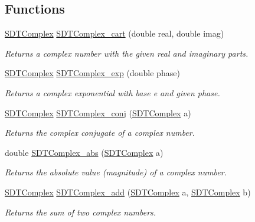 \subsection*{Functions}
\begin{DoxyCompactItemize}
\item 
\hyperlink{struct_s_d_t_complex}{S\+D\+T\+Complex} \hyperlink{group__complex_ga0e9bfb21fd5dd18d5c9ce8ca46c69bb9}{S\+D\+T\+Complex\+\_\+cart} (double real, double imag)
\begin{DoxyCompactList}\small\item\em Returns a complex number with the given real and imaginary parts. \end{DoxyCompactList}\item 
\hyperlink{struct_s_d_t_complex}{S\+D\+T\+Complex} \hyperlink{group__complex_gadab30e2d42c6d4d09a9377340d8130a5}{S\+D\+T\+Complex\+\_\+exp} (double phase)
\begin{DoxyCompactList}\small\item\em Returns a complex exponential with base e and given phase. \end{DoxyCompactList}\item 
\hyperlink{struct_s_d_t_complex}{S\+D\+T\+Complex} \hyperlink{group__complex_gaeeb0da7bd344c3c11659bdf6ed4fe28d}{S\+D\+T\+Complex\+\_\+conj} (\hyperlink{struct_s_d_t_complex}{S\+D\+T\+Complex} a)
\begin{DoxyCompactList}\small\item\em Returns the complex conjugate of a complex number. \end{DoxyCompactList}\item 
double \hyperlink{group__complex_gabacc30ac0cc7bf106ba1319c621f20be}{S\+D\+T\+Complex\+\_\+abs} (\hyperlink{struct_s_d_t_complex}{S\+D\+T\+Complex} a)
\begin{DoxyCompactList}\small\item\em Returns the absolute value (magnitude) of a complex number. \end{DoxyCompactList}\item 
\hyperlink{struct_s_d_t_complex}{S\+D\+T\+Complex} \hyperlink{group__complex_gad6478dedaf5b90f78c4cb6e4a6f6165c}{S\+D\+T\+Complex\+\_\+add} (\hyperlink{struct_s_d_t_complex}{S\+D\+T\+Complex} a, \hyperlink{struct_s_d_t_complex}{S\+D\+T\+Complex} b)
\begin{DoxyCompactList}\small\item\em Returns the sum of two complex numbers. \end{DoxyCompactList}\item 

\end{DoxyCompactItemize}
